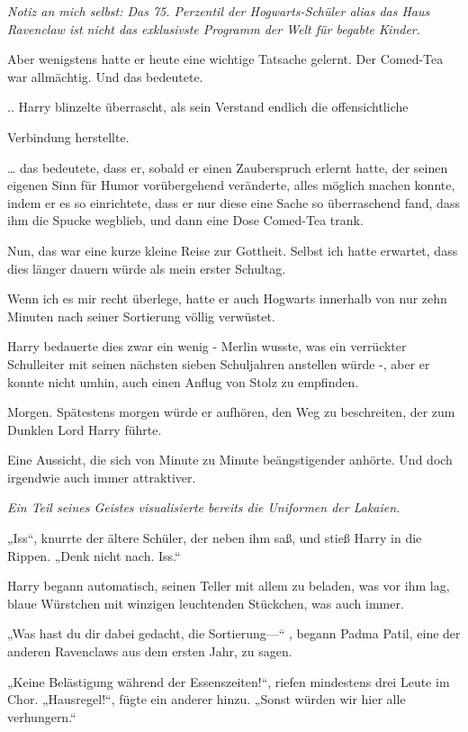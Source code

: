 {\emph{Notiz an mich selbst: Das 75. Perzentil der Hogwarts-Schüler alias das Haus Ravenclaw ist nicht das exklusivste Programm der Welt für begabte Kinder.}

Aber wenigstens hatte er heute eine wichtige Tatsache gelernt. Der Comed-Tea war allmächtig. Und das bedeutete.

.. Harry blinzelte überrascht, als sein Verstand endlich die offensichtliche

Verbindung herstellte.

… das bedeutete, dass er, sobald er einen Zauberspruch erlernt hatte, der seinen eigenen Sinn für Humor vorübergehend veränderte, alles möglich machen konnte, indem er es so einrichtete, dass er nur diese eine Sache so überraschend fand, dass ihm die Spucke wegblieb, und dann eine Dose Comed-Tea trank.

Nun, das war eine kurze kleine Reise zur Gottheit. Selbst ich hatte erwartet, dass dies länger dauern würde als mein erster Schultag.

Wenn ich es mir recht überlege, hatte er auch Hogwarts innerhalb von nur zehn Minuten nach seiner Sortierung völlig verwüstet.

Harry bedauerte dies zwar ein wenig - Merlin wusste, was ein verrückter Schulleiter mit seinen nächsten sieben Schuljahren anstellen würde -, aber er konnte nicht umhin, auch einen Anflug von Stolz zu empfinden.

Morgen. Spätestens morgen würde er aufhören, den Weg zu beschreiten, der zum Dunklen Lord Harry führte.

Eine Aussicht, die sich von Minute zu Minute beängstigender anhörte. Und doch irgendwie auch immer attraktiver.

\emph{Ein Teil seines Geistes visualisierte bereits die Uniformen der Lakaien.}

„Iss“, knurrte der ältere Schüler, der neben ihm saß, und stieß Harry in die Rippen. „Denk nicht nach. Iss.“

Harry begann automatisch, seinen Teller mit allem zu beladen, was vor ihm lag, blaue Würstchen mit winzigen leuchtenden Stückchen, was auch immer.

„Was hast du dir dabei gedacht, die Sortierung—“ , begann Padma Patil, eine der anderen Ravenclaws aus dem ersten Jahr, zu sagen.

„Keine Belästigung während der Essenszeiten!“, riefen mindestens drei Leute im Chor. „Hausregel!“, fügte ein anderer hinzu. „Sonst würden wir hier alle verhungern.“

}
